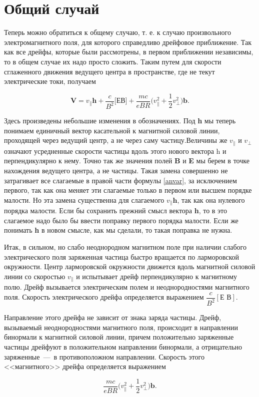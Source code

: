 \section{Общий случай}

Теперь можно обратиться к общему случаю, т. е. к случаю произвольного электромагнитного поля, для которого справедливо дрейфовое приближение. Так как все дрейфы, которые были рассмотрены, в первом приближении независимы, то в общем случае их надо просто сложить. Таким путем для скорости сглаженного движения ведущего центра в пространстве, где не текут электрические токи, получаем
    
    \begin{equation}
        \textbf{V}  = v_{\parallel}\textbf{h} + \frac{c}{B^2}\textbf{[ЕВ]} + \frac{mc}{eBR}\bigg(v^2_{\parallel}+\frac{1}{2}v^2_{\perp}\bigg)\textbf{b}.
        \label{anvar}
    \end{equation}
    
Здесь произведены небольшие изменения в обозначениях. Под \textbf{h} мы теперь понимаем единичный вектор касательной к магнитной силовой линии, проходящей через ведущий центр, а не через саму частицу.Величины же $v_{\parallel}$ и $v_{\perp}$ означают усредненные скорости частицы вдоль этого нового вектора h и перпендикулярно к нему. Точно так же значения полей \textbf{B} и \textbf{E} мы берем в точке нахождения ведущего центра, а не частицы. Такая замена совершенно не затрагивает все слагаемые
в правой части формулы \ref{anvar}, за исключением первого, так как она меняет эти слагаемые только в первом или высшем порядке малости. Но эта замена существенна для слагаемого $v_{\parallel}\textbf{h}$, так как она нулевого порядка малости. Если бы сохранить прежний смысл вектора \textbf{h}, то в это слагаемое надо было бы ввести поправку первого порядка малости. Если же понимать \textbf{h} в новом смысле, как мы сделали, то такая поправка не нужна.
    
Итак, в сильном, но слабо неоднородном магнитном поле при наличии слабого электрического поля заряженная частица быстро вращается по ларморовской окружности. Центр ларморовской окружности движется вдоль магнитной силовой линии со скоростью $v_{\parallel}$ и испытывает дрейф перпендикулярно к магнитному полю. Дрейф вызывается электрическим полем и неоднородностями магнитного поля. Скорость электрического дрейфа определяется выражением $\dfrac{c}{B^2}[\textbf{Е В}]$.

Направление этого дрейфа не зависит от знака заряда частицы. Дрейф, вызываемый неоднородностями магнитного поля, происходит в направлении бинормали к магнитной силовой линии, причем положительно заряженные частицы дрейфуют в положительном направлении бинормали, а отрицательно заряженные~---~в противоположном направлении. Скорость этого <<магнитного>> дрейфа определяется выражением	

\begin{equation*}
    \frac{mc}{eBR}\bigg(v^2_{\parallel}+\frac{1}{2}v^2_{\perp}\bigg)\textbf{b}.	
\end{equation*}
